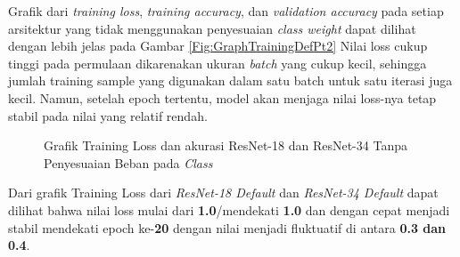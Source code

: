 Grafik dari \emph{training loss}, \emph{training accuracy}, dan \emph{validation accuracy} pada setiap arsitektur yang tidak menggunakan penyesuaian \emph{class weight} dapat dilihat dengan lebih jelas pada Gambar \ref{Fig:GraphTrainingDefPt2} Nilai loss cukup tinggi pada permulaan dikarenakan ukuran \emph{batch} yang cukup kecil, sehingga jumlah training sample yang digunakan dalam satu batch untuk satu iterasi juga kecil. Namun, setelah epoch tertentu, model akan menjaga nilai loss-nya tetap stabil pada nilai yang relatif rendah.
\pagebreak
\begin{figure}[hbtp]
	\centering
	\qquad
	\caption{Grafik Training Loss dan akurasi ResNet-18 dan ResNet-34 Tanpa Penyesuaian Beban pada \emph{Class}}
	\label{Fig:GraphTrainingDefPt1}
\end{figure}

Dari grafik Training Loss dari \emph{ResNet-18 Default} dan \emph{ResNet-34 Default}  dapat dilihat bahwa nilai loss mulai dari \textbf{1.0}/mendekati \textbf{1.0} dan dengan cepat menjadi stabil mendekati epoch ke-\textbf{20} dengan nilai menjadi fluktuatif di antara \textbf{0.3 dan 0.4}.

